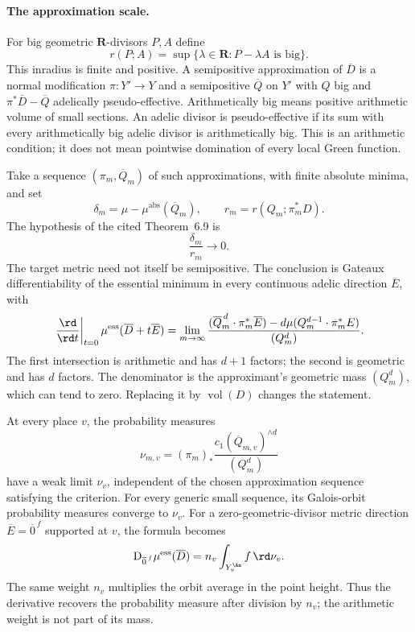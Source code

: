 \paragraph{The approximation scale.}
For big geometric $\mathbf R$-divisors $P,A$ define
\[
 r(P;A)=\sup\{\lambda\in\mathbf R:P-\lambda A\text{ is big}\}.
\]
This inradius is finite and positive. A semipositive approximation
of $\overline D$ is a normal modification $\pi:Y'\to Y$ and a
semipositive $\overline Q$ on $Y'$ with $Q$ big and
$\pi^*\overline D-\overline Q$ adelically pseudo-effective.
Arithmetically big means positive arithmetic volume of small sections.
An adelic divisor is pseudo-effective if its sum with every
arithmetically big adelic divisor is arithmetically big.
This is an arithmetic condition; it does not mean pointwise
domination of every local Green function.

Take a sequence $(\pi_m,\overline Q_m)$ of such approximations,
with finite absolute minima, and set
\[
 \delta_m=\mu-\mu^{\mathrm{abs}}(\overline Q_m),\qquad
 r_m=r(Q_m;\pi_m^*D).
\]
The hypothesis of the cited Theorem~6.9 is
\[
                         \frac{\delta_m}{r_m}\longrightarrow0.
\]
The target metric need not itself be semipositive. The conclusion
is Gateaux differentiability of the essential minimum in every
continuous adelic direction $\overline E$, with
\[
 \left.\frac{\rd}{\rd t}\right|_{t=0}
       \mu^{\mathrm{ess}}(\overline D+t\overline E)
 =\lim_{m\to\infty}
 \frac{(\overline Q_m^{\,d}\cdot\pi_m^*\overline E)
       -d\mu(Q_m^{d-1}\cdot\pi_m^*E)}{(Q_m^d)}.
\]
The first intersection is arithmetic and has $d+1$ factors;
the second is geometric and has $d$ factors. The denominator is
the approximant's geometric mass $(Q_m^d)$, which can tend to
zero. Replacing it by $\operatorname{vol}(D)$ changes the statement.

At every place $v$, the probability measures
\[
 \nu_{m,v}=(\pi_m)_*
       \frac{c_1(\overline Q_{m,v})^{\wedge d}}{(Q_m^d)}
\]
have a weak limit $\nu_v$, independent of the chosen approximation
sequence satisfying the criterion. For every generic small sequence,
its Galois-orbit probability measures converge to $\nu_v$.
For a zero-geometric-divisor metric direction
$\overline E=\overline0^{\,f}$ supported at $v$, the formula becomes
\[
 \mathrm D_{\overline0^{\,f}}\mu^{\mathrm{ess}}(\overline D)
                         =n_v\int_{Y_v^{\An}}f\,\rd\nu_v.
\]
The same weight $n_v$ multiplies the orbit average in the point
height. Thus the derivative recovers the probability measure after
division by $n_v$; the arithmetic weight is not part of its mass.

